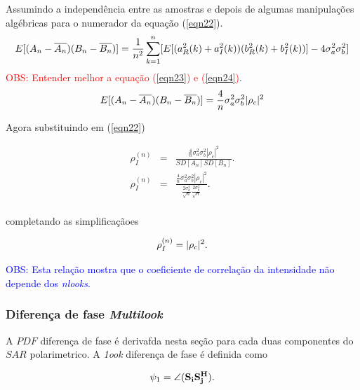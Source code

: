 \documentclass[12pt,a4paper]{article}
\begin{document}
Assumindo a independência entre as amostras e depois de algumas manipulações algébricas para o numerador da equação (\ref{eqn22}). 
\begin{equation}\label{eqn23}
	E[(A_n-\overline{A_n})(B_n-\overline{B_n})]=\frac{1}{n^2}\sum_{k=1}^{n}[E[(a_{R}^2(k)+a_{I}^2(k))(b_{R}^2(k)+b_{I}^2(k))]-4\sigma_a^2\sigma_b^2] \\
\end{equation}
\textcolor{red}{OBS: Entender melhor a equação (\ref{eqn23}) e (\ref{eqn24})}.
\begin{equation}\label{eqn24}
	E[(A_n-\overline{A_n})(B_n-\overline{B_n})]=\frac{4}{n}\sigma_a^2\sigma_b^2|\rho_c|^2\\
\end{equation}

Agora substituindo em (\ref{eqn22})

\begin{equation}\label{eqn25}
\begin{array}{ccc}
	\rho_I^{(n)}&=&\frac{\frac{4}{n}\sigma_a^2\sigma_b^2|\rho_c|^2}{SD[A_n]SD[B_n]}. \\
	\rho_I^{(n)}&=&\frac{\frac{4}{n}\sigma_a^2\sigma_b^2|\rho_c|^2}{\frac{2\sigma_a^2}{\sqrt{n}}\frac{2\sigma_b^2}{\sqrt{n}}}. \\
\end{array}
\end{equation}

completando as simplificaçãoes

\begin{equation}\label{eqn26}
	\rho_I^{(n)}=|\rho_c|^2. \\
\end{equation}

\textcolor{blue}{OBS: Esta relação mostra que o coeficiente de correlação da intensidade não depende dos {\it nlooks}.}

\subsubsection{Diferença de fase {\it Multilook}}

A $PDF$ diferença de fase é derivafda nesta seção para cada duas componentes do $SAR$ polarimetrico. A {\it 1ook} diferença de fase é definida como 


\begin{equation}\label{eqn27}
	\psi_1=\angle(\mathbf{S_iS_j^{H}}). \\
\end{equation}
\end{document}
